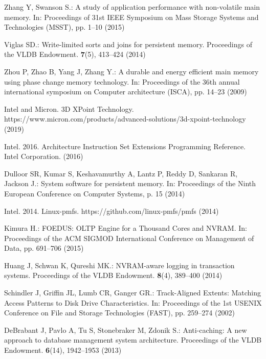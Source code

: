 Zhang Y, Swanson S.: A study of application performance with non-volatile main memory. In: Proceedings of 31st IEEE Symposium on Mass Storage Systems and Technologies (MSST), pp. 1--10 (2015)

Viglas SD.: Write-limited sorts and joins for persistent memory. Proceedings of the VLDB Endowment. \textbf{7}(5), 413--424 (2014)

Zhou P, Zhao B, Yang J, Zhang Y.: A durable and energy efficient main memory using phase change memory technology. In: Proceedings of the 36th annual international symposium on Computer architecture (ISCA), pp. 14--23 (2009)

Intel and Micron. 3D XPoint Technology. https://www.micron.com/products/advanced-solutions/3d-xpoint-technology (2019)

Intel. 2016. Architecture Instruction Set Extensions Programming Reference. Intel Corporation. (2016)

Dulloor SR, Kumar S, Keshavamurthy A, Lantz P, Reddy D, Sankaran R, Jackson J.: System software for persistent memory. In: Proceedings of the Ninth European Conference on Computer Systems, p. 15 (2014)

Intel. 2014. Linux-pmfs. https://github.com/linux-pmfs/pmfs (2014)

Kimura H.: FOEDUS: OLTP Engine for a Thousand Cores and NVRAM. In: Proceedings of the ACM SIGMOD International Conference on Management of Data, pp. 691--706 (2015)

Huang J, Schwan K, Qureshi MK.: NVRAM-aware logging in transaction systems. Proceedings of the VLDB Endowment. \textbf{8}(4), 389--400 (2014)

Schindler J, Griffin JL, Lumb CR, Ganger GR.: Track-Aligned Extents: Matching Access Patterns to Disk Drive Characteristics. In: Proceedings of the 1st USENIX Conference on File and Storage Technologies (FAST), pp. 259--274 (2002)

DeBrabant J, Pavlo A, Tu S, Stonebraker M, Zdonik S.: Anti-caching: A new approach to database management system architecture. Proceedings of the VLDB Endowment. \textbf{6}(14), 1942--1953 (2013)


